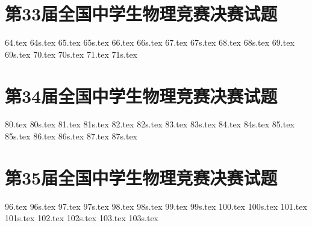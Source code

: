 \section{第33届全国中学生物理竞赛决赛试题}
{64.tex}
{64s.tex}
{65.tex}
{65s.tex}
{66.tex}
{66s.tex}
{67.tex}
{67s.tex}
{68.tex}
{68s.tex}
{69.tex}
{69s.tex}
{70.tex}
{70s.tex}
{71.tex}
{71s.tex}
\section{第34届全国中学生物理竞赛决赛试题}
{80.tex}
{80s.tex}
{81.tex}
{81s.tex}
{82.tex}
{82s.tex}
{83.tex}
{83s.tex}
{84.tex}
{84s.tex}
{85.tex}
{85s.tex}
{86.tex}
{86s.tex}
{87.tex}
{87s.tex}
\section{第35届全国中学生物理竞赛决赛试题}
{96.tex}
{96s.tex}
{97.tex}
{97s.tex}
{98.tex}
{98s.tex}
{99.tex}
{99s.tex}
{100.tex}
{100s.tex}
{101.tex}
{101s.tex}
{102.tex}
{102s.tex}
{103.tex}
{103s.tex}
